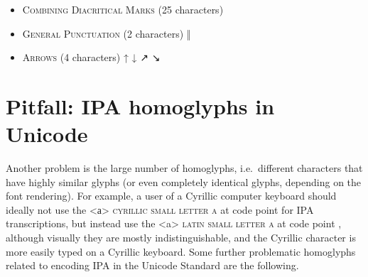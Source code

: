 \begin{itemize}[itemsep=4pt]
	\item \textsc{Combining Diacritical Marks} (25 characters) \newline 
	       
	       
	       
	   \ 
    \item \textsc{General Punctuation} (2 characters) \newline 
    ‖ 
	\item \textsc{Arrows} (4 characters) \newline 
	↑ ↓ ↗ ↘

\end{itemize}

\section{Pitfall: IPA homoglyphs in Unicode}
\label{pitfall-ipa-homoglyphs}

Another problem is the large number of homoglyphs, i.e.~different characters
that have highly similar glyphs (or even completely identical glyphs, depending
on the font rendering). For example, a user of a Cyrillic computer keyboard
should ideally not use the <а> \textsc{cyrillic small letter a} at code point
 for IPA transcriptions, but instead use the <a> \textsc{latin small
letter a} at code point , although visually they are mostly
indistinguishable, and the Cyrillic character is more easily typed on a Cyrillic
keyboard. Some further problematic homoglyphs related to encoding IPA in the
Unicode Standard are the following.

